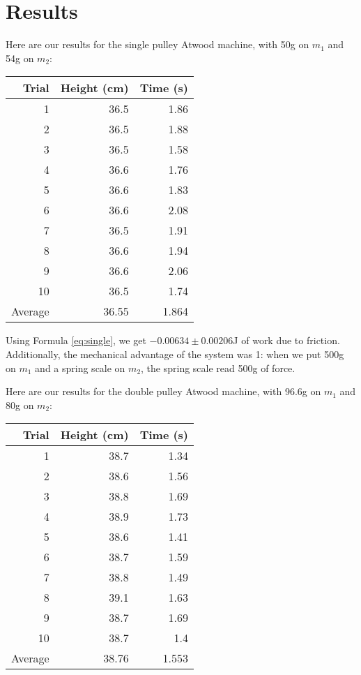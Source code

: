 \documentclass[12pt]{article}
\begin{document}
\section{Results}
\label{sec:orgc2ee907}

Here are our results for the single pulley Atwood machine, with 50g on \(m_1\) and 54g on \(m_2\):

\begin{center}
\begin{tabular}{r|r|r}
Trial & Height (cm) & Time (s)\\
\hline
1 & 36.5 & 1.86\\
2 & 36.5 & 1.88\\
3 & 36.5 & 1.58\\
4 & 36.6 & 1.76\\
5 & 36.6 & 1.83\\
6 & 36.6 & 2.08\\
7 & 36.5 & 1.91\\
8 & 36.6 & 1.94\\
9 & 36.6 & 2.06\\
10 & 36.5 & 1.74\\
\hline
Average & 36.55 & 1.864\\
\end{tabular}
\end{center}

Using Formula \ref{eq:single}, we get \(-0.00634 \pm 0.00206\)J of work due to friction. Additionally, the mechanical advantage of the system was 1: when we put 500g on \(m_1\) and a spring scale on \(m_2\), the spring scale read 500g of force.

Here are our results for the double pulley Atwood machine, with 96.6g on \(m_1\) and 80g on \(m_2\):

\begin{center}
\begin{tabular}{r|r|r}
Trial & Height (cm) & Time (s)\\
\hline
1 & 38.7 & 1.34\\
2 & 38.6 & 1.56\\
3 & 38.8 & 1.69\\
4 & 38.9 & 1.73\\
5 & 38.6 & 1.41\\
6 & 38.7 & 1.59\\
7 & 38.8 & 1.49\\
8 & 39.1 & 1.63\\
9 & 38.7 & 1.69\\
10 & 38.7 & 1.4\\
\hline
Average & 38.76 & 1.553\\
\end{tabular}
\end{center}
\end{document}
